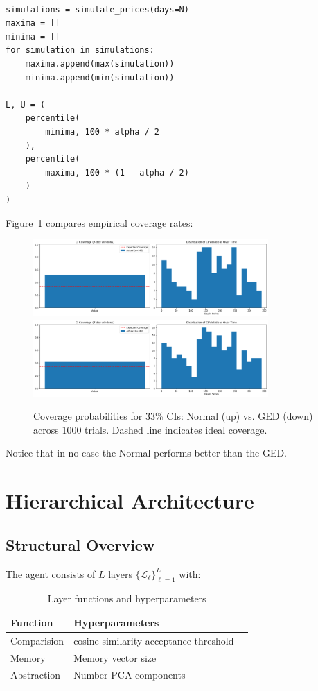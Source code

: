 \documentclass[12pt]{article}
\begin{document}
\begin{lstlisting}

simulations = simulate_prices(days=N)
maxima = []
minima = []
for simulation in simulations:
    maxima.append(max(simulation))
    minima.append(min(simulation))

L, U = (
    percentile(
        minima, 100 * alpha / 2
    ),
    percentile(
        maxima, 100 * (1 - alpha / 2)
    )
)

\end{lstlisting}

Figure~\ref{fig:ci} compares empirical coverage rates:

\begin{figure}[H]
    \centering
    \includegraphics[width=0.8\textwidth]{NORM.png}
    \includegraphics[width=0.8\textwidth]{GED.png}
    \caption{Coverage probabilities for 33\% CIs: Normal (up) vs. GED (down) across 1000 trials. Dashed line indicates ideal coverage.}
    \label{fig:ci}
\end{figure}

Notice that in no case the Normal performs better than the GED.

\section{Hierarchical Architecture}
\label{sec:architecture}

\subsection{Structural Overview}
The agent consists of $L$ layers $\{\mathscr{L}_\ell\}_{\ell=1}^L$ with:

\begin{table}[H]
\centering
\caption{Layer functions and hyperparameters}
\label{tab:layers}
\begin{tabular}{lll}
\toprule
\textbf{Function} & \textbf{Hyperparameters} \\
\midrule
Comparision & cosine similarity acceptance threshold \\
Memory & Memory vector size \\
Abstraction & Number PCA components \\
\bottomrule
\end{tabular}
\end{table}
\end{document}
